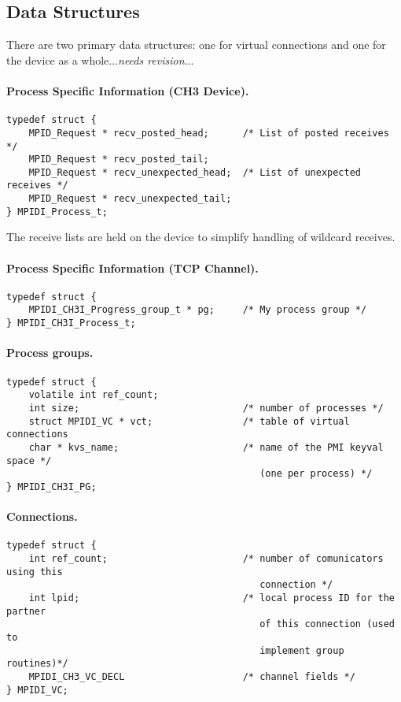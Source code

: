 \documentclass{article}
\begin{document}
\subsection{Data Structures}
There are two primary data structures: one for virtual connections and one for
the device as a whole...\emph{needs revision}...

\paragraph{Process Specific Information (CH3 Device).}
\begin{verbatim}
typedef struct {
    MPID_Request * recv_posted_head;      /* List of posted receives */
    MPID_Request * recv_posted_tail;
    MPID_Request * recv_unexpected_head;  /* List of unexpected receives */
    MPID_Request * recv_unexpected_tail;
} MPIDI_Process_t;
\end{verbatim}
The receive lists are held on the device to simplify handling of wildcard
receives.  

\paragraph{Process Specific Information (TCP Channel).}
\begin{verbatim}
typedef struct {
    MPIDI_CH3I_Progress_group_t * pg;     /* My process group */
} MPIDI_CH3I_Process_t;
\end{verbatim}

\paragraph{Process groups.}
\begin{verbatim}
typedef struct {
    volatile int ref_count;
    int size;                             /* number of processes */
    struct MPIDI_VC * vct;                /* table of virtual connections
    char * kvs_name;                      /* name of the PMI keyval space */
                                             (one per process) */
} MPIDI_CH3I_PG;
\end{verbatim}

\paragraph{Connections.}
\begin{verbatim}
typedef struct { 
    int ref_count;                        /* number of comunicators using this
                                             connection */
    int lpid;                             /* local process ID for the partner
                                             of this connection (used to
                                             implement group routines)*/
    MPIDI_CH3_VC_DECL                     /* channel fields */
} MPIDI_VC;
\end{verbatim}
\end{document}
